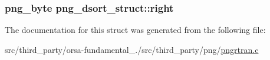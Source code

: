 \subsubsection[{right}]{\setlength{\rightskip}{0pt plus 5cm}png\+\_\+byte png\+\_\+dsort\+\_\+struct\+::right}\label{structpng__dsort__struct_a9cfe3ab6de9319c0d18dd16075c21fa2}


The documentation for this struct was generated from the following file\+:\begin{DoxyCompactItemize}
\item 
src/third\+\_\+party/orsa-\/fundamental\+\_./src/third\+\_\+party/png/\hyperlink{pngrtran_8c}{pngrtran.\+c}\end{DoxyCompactItemize}
